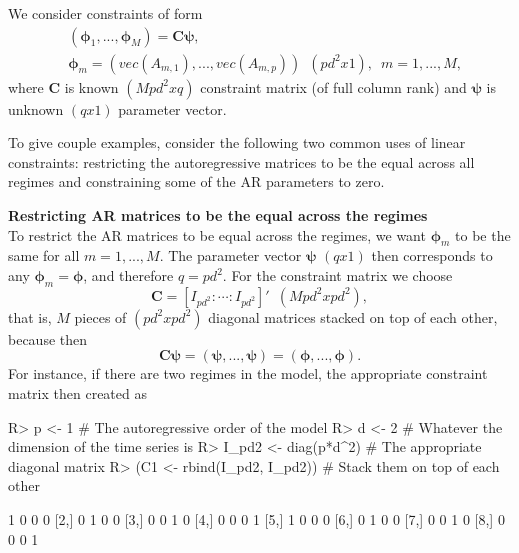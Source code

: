 \documentclass[nojss]{jss}
\begin{document}
We consider constraints of form
\begin{align}
& (\boldsymbol{\phi}_1,...,\boldsymbol{\phi}_M) = \boldsymbol{C}\boldsymbol{\psi},\\
& \boldsymbol{\phi}_m=(vec(A_{m,1}),...,vec(A_{m,p}))\enspace (pd^2x1), \enspace m=1,...,M,
\end{align}
where $\boldsymbol{C}$ is known $(Mpd^2xq)$ constraint matrix (of full column rank) and $\boldsymbol{\psi}$ is unknown $(qx1)$ parameter vector.

To give couple examples, consider the following two common uses of linear constraints: restricting the autoregressive matrices to be the equal across all regimes and constraining some of the AR parameters to zero.

\textbf{Restricting AR matrices to be the equal across the regimes}\\
To restrict the AR matrices to be equal across the regimes, we want $\boldsymbol{\phi}_m$ to be the same for all $m=1,...,M$. The parameter vector $\boldsymbol{\psi}$ $(qx1)$ then corresponds to any $\boldsymbol{\phi}_m=\boldsymbol{\phi}$, and therefore $q=pd^2$. For the constraint matrix we choose
\begin{equation}
\boldsymbol{C} = [I_{pd^2}:\cdots:I_{pd^2}]' \enspace (Mpd^2xpd^2),
\end{equation}
that is, $M$ pieces of $(pd^2xpd^2)$ diagonal matrices stacked on top of each other, because then
\begin{equation}
\boldsymbol{C}\boldsymbol{\psi}=(\boldsymbol{\psi},...,\boldsymbol{\psi})=(\boldsymbol{\phi},...,\boldsymbol{\phi}).
\end{equation}
For instance, if there are two regimes in the model, the appropriate constraint matrix then created as
%
\begin{CodeChunk}
\begin{CodeInput}
R> p <- 1 # The autoregressive order of the model
R> d <- 2 # Whatever the dimension of the time series is
R> I_pd2 <- diag(p*d^2) # The appropriate diagonal matrix
R> (C1 <- rbind(I_pd2, I_pd2)) # Stack them on top of each other
\end{CodeInput}
\begin{CodeOutput}
     [,1] [,2] [,3] [,4]
[1,]    1    0    0    0
[2,]    0    1    0    0
[3,]    0    0    1    0
[4,]    0    0    0    1
[5,]    1    0    0    0
[6,]    0    1    0    0
[7,]    0    0    1    0
[8,]    0    0    0    1
\end{CodeOutput}
\end{CodeChunk}
\end{document}
